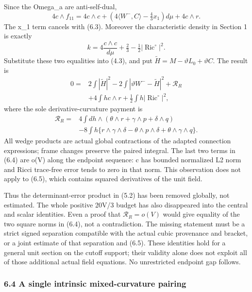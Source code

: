 \documentclass[
  10pt,
]{article}
\begin{document}
Since the Omega\_a are anti-self-dual, \[
 4c\wedge f_{11}
 =4c\wedge c+
     (4\langle W^-,C\rangle-\tfrac43x_1)d\mu
       +4c\wedge r.
\] The x\_1 term cancels with (6.3). Moreover the characteristic density
in Section 1 is exactly \[
                 k=4\frac{c\wedge c}{d\mu}
                      +\tfrac23-\tfrac12|\operatorname{Ric}^{\circ}|^2.
\] Substitute these two equalities into (4.3), and put
\(\widetilde H=M-\vartheta L_0+\vartheta C\). The result is \[
\boxed{\begin{aligned}
 0={}&2\int|\widetilde H|^2
       -2\int|\vartheta W^--\widetilde H|^2
       +\mathcal R_R\\
     &+4\int h c\wedge r
       +\tfrac12\int h|\operatorname{Ric}^{\circ}|^2,
\end{aligned}}                                                    \tag{6.4}
\] where the sole derivative-curvature payment is \[
\begin{aligned}
 \mathcal R_R={}&4\int dh\wedge
          (\theta\wedge r+\gamma\wedge p+\delta\wedge q)\\
 &-8\int h\{r\wedge\gamma\wedge\delta
       -\theta\wedge p\wedge\delta+\theta\wedge\gamma\wedge q\}.
\end{aligned}                                                     \tag{6.5}
\] All wedge products are actual global contractions of the adapted
connection expressions; frame changes preserve the paired integral. The
last two terms in (6.4) are o(V) along the endpoint sequence: c has
bounded normalized L2 norm and Ricci trace-free error tends to zero in
that norm. This observation does not apply to (6.5), which contains
squared derivatives of the unit field.

Thus the determinant-error product in (5.2) has been removed globally,
not estimated. The whole positive 20V/3 budget has also disappeared into
the central and scalar identities. Even a proof that
\(\mathcal R_R=o(V)\) would give equality of the two square norms in
(6.4), not a contradiction. The missing statement must be a strict
signed separation compatible with the actual cubic provenance and
bracket, or a joint estimate of that separation and (6.5). These
identities hold for a general unit section on the cutoff support; their
validity alone does not exploit all of those additional actual field
equations. No unrestricted endpoint gap follows.

\hypertarget{a-single-intrinsic-mixed-curvature-pairing}{%
\subsubsection{6.4 A single intrinsic mixed-curvature
pairing}\label{a-single-intrinsic-mixed-curvature-pairing}}
\end{document}
